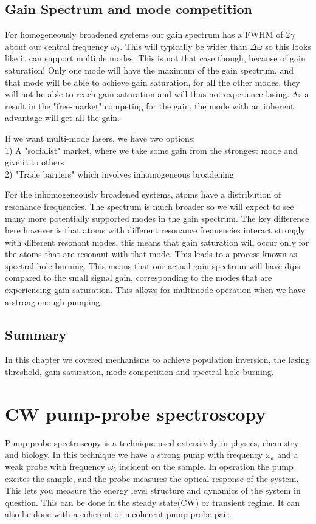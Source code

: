 \subsection{Gain Spectrum and mode competition}
For homogeneously broadened systems our gain spectrum has a FWHM of $2\gamma$ about our central frequency $\omega_0$. This will typically be wider than $\Delta\omega$ so this looks like it can support multiple modes.
This is not that case though, because of gain saturation! 
Only one mode  will have the maximum of the gain spectrum, and that mode will be able to achieve gain saturation, for all the other modes, they will not be able to reach gain saturation and will thus not experience lasing.
As a result in the "free-market" competing for the gain, the mode with an inherent advantage will get all the gain.

If we want multi-mode lasers, we have two options:\\
1) A "socialist" market, where we take some gain from the strongest mode and give it to others\\
2) "Trade barriers" which involves inhomogeneous broadening

For the inhomogeneously broadened systems, atoms have a distribution of resonance frequencies. The spectrum is much broader so we will expect to see many more potentially supported modes in the gain spectrum.
The key difference here however is that atoms with different resonance frequencies interact strongly with different resonant modes, this means that gain saturation will occur only for the atoms that are resonant with that mode.
This leads to a process known as spectral hole burning. This means that our actual gain spectrum will have dips compared to the small signal gain, corresponding to the modes that are experiencing gain saturation.
This allows for multimode operation when we have a strong enough pumping.
\subsection{Summary}
In this chapter we covered mechanisms to achieve population inversion, the lasing threshold, gain saturation, mode competition and spectral hole burning.
\section{CW pump-probe spectroscopy}
Pump-probe spectroscopy is a technique used extensively in physics, chemistry and biology. In this technique we have a strong pump with frequency $\omega_a$ and a weak probe with frequency $\omega_b$ incident on the sample.
In operation the pump excites the sample, and the probe measures the optical response of the system. This lets you measure the energy level structure and dynamics of the system in question.
This can be done in the steady state(CW) or transient regime. It can also be done with a coherent or incoherent pump probe pair.

